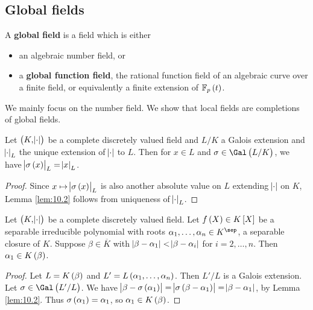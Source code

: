 \pagebreak

\subsection{Global fields}


\begin{definition}
A \textbf{global field} is a field which is either
\begin{itemize}
\item an algebraic number field, or
\item a \textbf{global function field}, the rational function field of an algebraic curve over a finite field, or equivalently a finite extension of $ \FF_p\br{t} $.
\end{itemize}
\end{definition}

We mainly focus on the number field. We show that local fields are completions of global fields.

\begin{lemma}
\label{lem:10.2}
Let $ \br{K, \abs{\cdot}} $ be a complete discretely valued field and $ L / K $ a Galois extension and $ \abs{\cdot}_L $ the unique extension of $ \abs{\cdot} $ to $ L $. Then for $ x \in L $ and $ \sigma \in \Gal\br{L / K} $, we have $ \abs{\sigma\br{x}}_L = \abs{x}_L $.
\end{lemma}

\begin{proof}
Since $ x \mapsto \abs{\sigma\br{x}}_L $ is also another absolute value on $ L $ extending $ \abs{\cdot} $ on $ K $, Lemma \ref{lem:10.2} follows from uniqueness of $ \abs{\cdot}_L $.
\end{proof}

\begin{lemma}
Let $ \br{K, \abs{\cdot}} $ be a complete discretely valued field. Let $ f\br{X} \in K\sbr{X} $ be a separable irreducible polynomial with roots $ \alpha_1, \dots, \alpha_n \in K^{\sep} $, a separable closure of $ K $. Suppose $ \beta \in \overline{K} $ with $ \abs{\beta - \alpha_1} < \abs{\beta - \alpha_i} $ for $ i = 2, \dots, n $. Then $ \alpha_1 \in K\br{\beta} $.
\end{lemma}

\begin{proof}
Let $ L = K\br{\beta} $ and $ L' = L\br{\alpha_1, \dots, \alpha_n} $. Then $ L' / L $ is a Galois extension. Let $ \sigma \in \Gal\br{L' / L} $. We have $ \abs{\beta - \sigma\br{\alpha_1}} = \abs{\sigma\br{\beta - \alpha_1}} = \abs{\beta - \alpha_1} $, by Lemma \ref{lem:10.2}. Thus $ \sigma\br{\alpha_1} = \alpha_1 $, so $ \alpha_1 \in K\br{\beta} $.
\end{proof}

